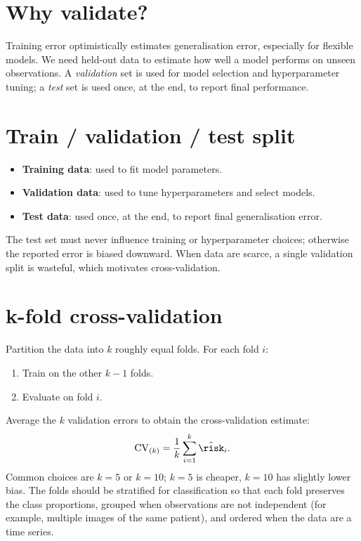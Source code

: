 \documentclass[a4paper, 12pt]{book}
\begin{document}
\section{Why validate?}

Training error optimistically estimates generalisation error, especially for flexible
models. We need held-out data to estimate how well a model performs on unseen
observations. A \emph{validation} set is used for model selection and hyperparameter
tuning; a \emph{test} set is used once, at the end, to report final performance.

\section{Train / validation / test split}

\begin{itemize}
    \item \textbf{Training data}: used to fit model parameters.
    \item \textbf{Validation data}: used to tune hyperparameters and select models.
    \item \textbf{Test data}: used once, at the end, to report final generalisation
    error.
\end{itemize}
The test set must never influence training or hyperparameter choices; otherwise the
reported error is biased downward. When data are scarce, a single validation split is
wasteful, which motivates cross-validation.

\section{k-fold cross-validation}

Partition the data into $k$ roughly equal folds. For each fold $i$:
\begin{enumerate}
    \item Train on the other $k-1$ folds.
    \item Evaluate on fold $i$.
\end{enumerate}
Average the $k$ validation errors to obtain the cross-validation estimate:
\begin{align}
    \mathrm{CV}_{(k)}
    = \frac{1}{k}\sum_{i=1}^k \hat{\risk}_i.
\end{align}
Common choices are $k=5$ or $k=10$; $k=5$ is cheaper, $k=10$ has slightly lower bias.
The folds should be stratified for classification so that each fold preserves the
class proportions, grouped when observations are not independent (for example,
multiple images of the same patient), and ordered when the data are a time series.
\end{document}
